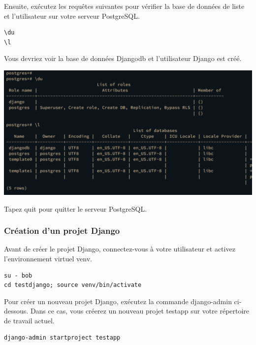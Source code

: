 \documentclass{article}
\begin{document}
Ensuite, exécutez les requêtes suivantes pour vérifier la base de données de liste et l'utilisateur sur votre serveur PostgreSQL.

\begin{verbatim}
\du
\l
\end{verbatim}

Vous devriez voir la base de données Djangodb et l'utilisateur Django est créé.

\begin{center}
\includegraphics[width=15cm]{images/image10.png}
\end{center}

Tapez quit pour quitter le serveur PostgreSQL.

\subsubsection{Création d'un projet Django}
Avant de créer le projet Django, connectez-vous à votre utilisateur et activez l'environnement virtuel venv.

\begin{verbatim}
su - bob
cd testdjango; source venv/bin/activate
\end{verbatim}

Pour créer un nouveau projet Django, exécutez la commande django-admin ci-dessous. Dans ce cas, vous créerez un nouveau projet testapp sur votre répertoire de travail actuel.

\begin{verbatim}
django-admin startproject testapp 
\end{verbatim}
\end{document}
